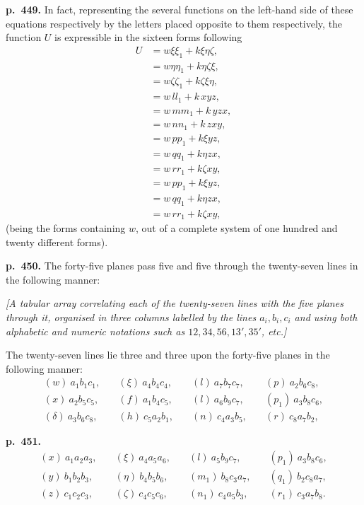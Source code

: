 \documentclass[11pt]{article}
\begin{document}
\bigskip
\noindent\textbf{p.~449.} In fact, representing the several functions on the left-hand side of these equations respectively by the letters placed opposite to them respectively, the function $U$ is expressible in the sixteen forms following
\[
\begin{aligned}
U &= w\xi\xi_1 + k\xi\eta\zeta,\\
  &= w\eta\eta_1 + k\eta\zeta\xi,\\
  &= w\zeta\zeta_1 + k\zeta\xi\eta,\\
  &= w\,ll_1 + k\,xyz,\\
  &= w\,mm_1 + k\,yzx,\\
  &= w\,nn_1 + k\,zxy,\\
  &= w\,pp_1 + k\xi yz,\\
  &= w\,qq_1 + k\eta zx,\\
  &= w\,rr_1 + k\zeta xy,\\
  &= w\,pp_1 + k\xi yz,\\
  &= w\,qq_1 + k\eta zx,\\
  &= w\,rr_1 + k\zeta xy,
\end{aligned}
\]
(being the forms containing $w$, out of a complete system of one hundred and twenty different forms).

\bigskip
\noindent\textbf{p.~450.} The forty-five planes pass five and five through the twenty-seven lines in the following manner:

\textit{[A tabular array correlating each of the twenty-seven lines with the five planes through it, organised in three columns labelled by the lines $a_i, b_i, c_i$ and using both alphabetic and numeric notations such as $12, 34, 56, 13', 35'$, etc.]}

The twenty-seven lines lie three and three upon the forty-five planes in the following manner:
\[
\begin{aligned}
(w)\ a_1 b_1 c_1, & \quad (\xi)\ a_4 b_4 c_4, & \quad (l)\ a_7 b_7 c_7, & \quad (p)\ a_2 b_6 c_8,\\
(x)\ a_2 b_5 c_5, & \quad (f)\ a_1 b_4 c_5, & \quad (l)\ a_6 b_9 c_7, & \quad (p_1)\ a_3 b_8 c_6,\\
(\delta)\ a_3 b_6 c_8, & \quad (h)\ c_5 a_2 b_1, & \quad (n)\ c_4 a_3 b_5, & \quad (r)\ c_8 a_7 b_2,
\end{aligned}
\]

\noindent\textbf{p.~451.}
\[
\begin{aligned}
(x)\ a_1 a_2 a_3, & \quad (\xi)\ a_4 a_5 a_6, & \quad (l)\ a_5 b_9 c_7, & \quad (p_1)\ a_3 b_8 c_6,\\
(y)\ b_1 b_2 b_3, & \quad (\eta)\ b_4 b_5 b_6, & \quad (m_1)\ b_8 c_3 a_7, & \quad (q_1)\ b_2 c_8 a_7,\\
(z)\ c_1 c_2 c_3, & \quad (\zeta)\ c_4 c_5 c_6, & \quad (n_1)\ c_4 a_5 b_3, & \quad (r_1)\ c_3 a_7 b_8.
\end{aligned}
\]
\end{document}
